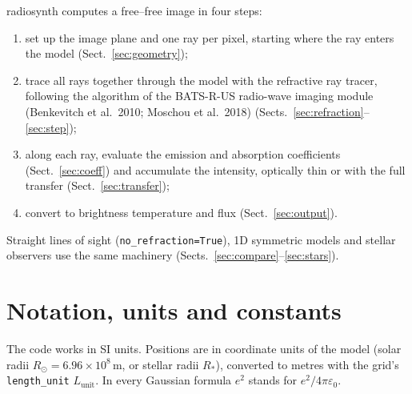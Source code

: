 \documentclass[11pt,a4paper]{article}
\newcommand{\code}[1]{\texttt{#1}}
\newcommand{\rsun}{R_\odot}
\begin{document}
\textsf{radiosynth} computes a free--free image in four steps:
\begin{enumerate}
  \item set up the image plane and one ray per pixel, starting where the ray enters the model
        (Sect.~\ref{sec:geometry});
  \item trace all rays together through the model with the refractive ray tracer, following
        the algorithm of the BATS-R-US radio-wave imaging module (Benkevitch et al.\ 2010;
        Moschou et al.\ 2018) (Sects.~\ref{sec:refraction}--\ref{sec:step});
  \item along each ray, evaluate the emission and absorption coefficients
        (Sect.~\ref{sec:coeff}) and accumulate the intensity, optically thin or with the full
        transfer (Sect.~\ref{sec:transfer});
  \item convert to brightness temperature and flux (Sect.~\ref{sec:output}).
\end{enumerate}
Straight lines of sight (\code{no\_refraction=True}), 1D symmetric models and stellar
observers use the same machinery (Sects.~\ref{sec:compare}--\ref{sec:stars}).

\section{Notation, units and constants}\label{sec:notation}

The code works in SI units. Positions are in coordinate units of the model (solar radii
$\rsun=6.96\times10^8$\,m, or stellar radii $R_\ast$), converted to metres with the grid's
\code{length\_unit} $L_\text{unit}$. In every Gaussian formula $e^2$ stands for
$e^2/4\pi\varepsilon_0$.
\end{document}
